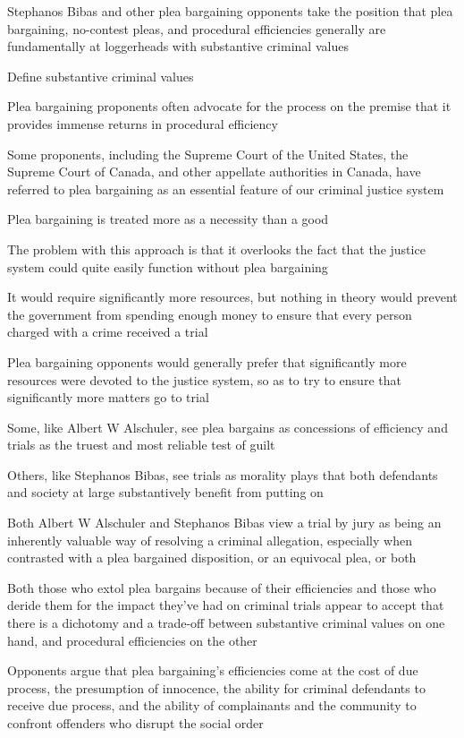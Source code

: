 Stephanos Bibas and other plea bargaining opponents take the position that plea bargaining, no-contest pleas, and procedural efficiencies generally are fundamentally at loggerheads with substantive criminal values

Define substantive criminal values

Plea bargaining proponents often advocate for the process on the premise that it provides immense returns in procedural efficiency

Some proponents, including the Supreme Court of the United States, the Supreme Court of Canada, and other appellate authorities in Canada, have referred to plea bargaining as an essential feature of our criminal justice system

Plea bargaining is treated more as a necessity than a good

The problem with this approach is that it overlooks the fact that the justice system could quite easily function without plea bargaining

It would require significantly more resources, but nothing in theory would prevent the government from spending enough money to ensure that every person charged with a crime received a trial

Plea bargaining opponents would generally prefer that significantly more resources were devoted to the justice system, so as to try to ensure that significantly more matters go to trial

Some, like Albert W Alschuler, see plea bargains as concessions of efficiency and trials as the truest and most reliable test of guilt

Others, like Stephanos Bibas, see trials as morality plays that both defendants and society at large substantively benefit from putting on

Both Albert W Alschuler and Stephanos Bibas  view a trial by jury as being an inherently valuable way of resolving a criminal allegation, especially when contrasted with a plea bargained disposition, or an equivocal plea, or both

Both those who extol plea bargains because of their efficiencies and those who deride them for the impact they've had on criminal trials appear to accept that there is a dichotomy and a trade-off between substantive criminal values on one hand, and procedural efficiencies on the other

Opponents argue that plea bargaining's efficiencies come at the cost of due process, the presumption of innocence, the ability for criminal defendants to receive due process, and the ability of complainants and the community to confront offenders who disrupt the social order

